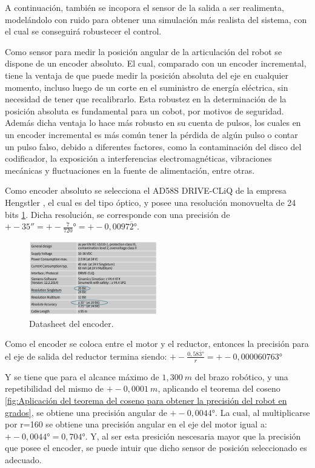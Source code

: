 \documentclass{article}
\begin{document}
\begin{sloppypar}
A continuación, también se incopora el sensor de la salida a ser realimenta, modelándolo con ruido para obtener una simulación más realista del sistema, con el cual se conseguirá robustecer el control.

Como sensor para medir la posición angular de la articulación del robot se dispone de un encoder absoluto. El cual, comparado con un encoder incremental, tiene la ventaja de que puede medir la posición absoluta del eje en cualquier momento, incluso luego de un corte en el suministro de energía eléctrica, sin necesidad de tener que recalibrarlo. Esta robustez en la determinación de la posición absoluta es fundamental para un cobot, por motivos de seguridad. Además dicha ventaja lo hace más robusto en su cuenta de pulsos, los cuales en un encoder incremental es más común tener la pérdida de algún pulso o contar un pulso falso, debido a diferentes factores, como la contaminación del disco del codificador, la exposición a interferencias electromagnéticas, vibraciones mecánicas y fluctuaciones en la fuente de alimentación, entre otras.

Como encoder absoluto se selecciona el AD58S DRIVE-CLiQ de la empresa Hengstler \cite{Absolute_Encoder_Datasheet}, el cual es del tipo óptico, y posee una resolución monovuelta de 24 bits \ref{fig:Datasheet del encoder}. Dicha resolución, se corresponde con una precisión de $+-35''=+-\frac{7}{720}\text{°}=+-0,0097\overline{2}$°.

\begin{figure}[H]
    \centering
    \includegraphics[width=0.5\textwidth]{Datasheet del encoder}
    \caption{Datasheet del encoder.}
    \label{fig:Datasheet del encoder}
\end{figure}

Como el encoder se coloca entre el motor y el reductor, entonces la precisión para el eje de salida del reductor termina siendo: $+-\frac{0,58\overline{3}\text{°}}{r}=+-0,000060763$°

Y se tiene que para el alcance máximo de $1,300 ~m$ del brazo robótico, y una repetibilidad del mismo de $+-0,0001 ~m$, aplicando el teorema del coseno \ref{fig:Aplicación del teorema del coseno para obtener la precisión del robot en grados}, se obtiene una precisión angular de $+-0,0044$°. La cual, al multiplicarse por r=160 se obtiene una precisión angular en el eje del motor igual a: $+-0,0044\text{°}=0,704$°. Y, al ser esta presición nescesaria mayor que la precisión que posee el encoder, se puede intuir que dicho sensor de posición seleccionado es adecuado.


\end{sloppypar}
\end{document}
